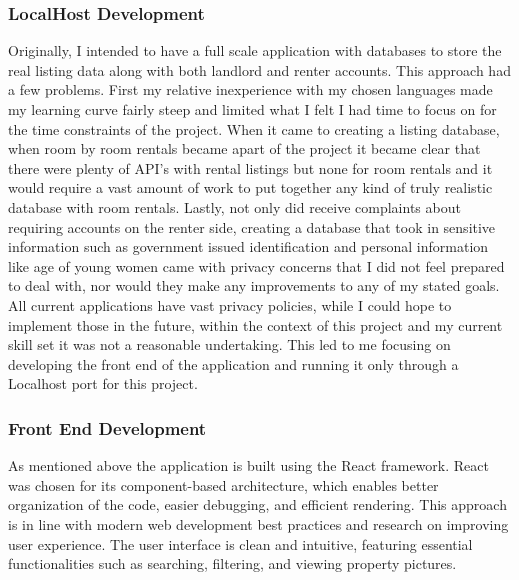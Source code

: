 \documentclass[10pt,twocolumn]{article}
\begin{document}
\subsubsection{LocalHost Development}
 Originally, I intended to have a full scale application with databases to store the real listing data along with both landlord and renter accounts. This approach had a few problems. First my relative inexperience with my chosen languages made my learning curve fairly steep and limited what I felt I had time to focus on for the time constraints of the project.  When it came to creating a listing database, when room by room rentals became apart of the project it became clear that there were plenty of API's with rental listings but none for room rentals and it would require a vast amount of work to put together any kind of truly realistic database with room rentals. Lastly, not only did receive complaints about requiring accounts on the renter side, creating a database that took in sensitive information such as government issued identification and personal information like age of young women came with privacy concerns that I did not feel prepared to deal with, nor would they make any improvements to any of my stated goals. All current applications have vast privacy policies, while I could hope to implement those in the future, within the context of this project and my current skill set it was not a reasonable undertaking. \cite{airbnb_privacy} This led to me focusing on developing the front end of the application and running it only through a Localhost port for this project. 

\subsubsection{Front End Development}
As mentioned above the application is built using the React framework. React was chosen for its component-based architecture, which enables better organization of the code, easier debugging, and efficient rendering. This approach is in line with modern web development best practices and research on improving user experience. The user interface is clean and intuitive, featuring essential functionalities such as searching, filtering, and viewing property pictures. 
\end{document}
